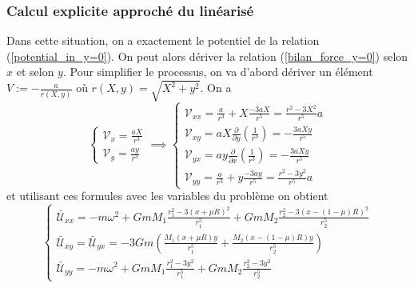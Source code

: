 \documentclass[12pt]{article}
\theoremstyle{definition}
\theoremstyle{definition}
\begin{document}
	\subsubsection{Calcul explicite approché du linéarisé}
	Dans cette situation, on a exactement le potentiel de la relation (\ref{potential_in_y=0}). On peut alors dériver la relation (\ref{bilan_force_y=0}) selon $x$ et selon $y$. Pour simplifier le processus, on va d'abord dériver un élément $V := -\frac{a}{r(X,y)}$ où $r(X,y) = \sqrt{X^2+y^2}$. On a
	\begin{equation}
		\begin{cases}
			\mathcal{V}_{x} = \frac{a X}{r^3}
			\\
			\mathcal{V}_{y} = \frac{a y}{r^3}
		\end{cases}
		\implies
		\begin{cases}
			\mathcal{V}_{xx} = \frac{a}{r^3} + X\frac{-3aX}{r^5} = \frac{r^2-3X^2}{r^5}a
			\\
			\mathcal{V}_{xy} = aX \frac{\partial}{\partial y}(\frac{1}{r^3}) = -\frac{3aXy}{r^5}
			\\
			\mathcal{V}_{yx} = ay \frac{\partial}{\partial x}(\frac{1}{r^3}) = -\frac{3aXy}{r^5}
			\\
			\mathcal{V}_{yy} = \frac{a}{r^3} + y\frac{-3ay}{r^5} = \frac{r^2-3y^2}{r^5}a
		\end{cases}
	\end{equation}
	et utilisant ces formules avec les variables du problème on obtient 
	\begin{equation}
		\begin{cases}
			\bar{\mathcal{U}}_{xx} = -m\omega^2 
			+ GmM_1\frac{r_1^2 - 3(x+\mu R)^2}{r_1^5} 
			+ GmM_2\frac{r_2^2 - 3(x-(1-\mu)R)^2}{r_2^5}
			\\
			\bar{\mathcal{U}}_{xy} = \bar{\mathcal{U}}_{yx} =
			-3Gm(\frac{M_1(x+\mu R)y}{r_1^5}+\frac{M_2(x-(1-\mu)R)y}{r_2^5})
			\\
			\bar{\mathcal{U}}_{yy} = -m\omega^2 
			+ GmM_1\frac{r_1^2 - 3y^2}{r_1^5} 
			+ GmM_2\frac{r_2^2 - 3y^2}{r_2^5}
		\end{cases}
	\end{equation}
	
\end{document}
